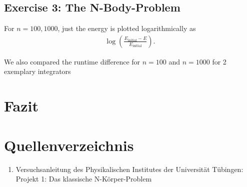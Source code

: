 \documentclass[ngerman]{article}
\begin{document}

\subsection{Exercise 3: The N-Body-Problem}  
For $n=100, 1000$, just the energy is plotted logarithmically as
\begin{align}
    \log(\frac{E_{\text{initial}}-E}{E_{\text{initial}}}).
\end{align}





We also compared the runtime difference for $n=100$ and $n=1000$  for 2 exemplary integrators
\section{Fazit}
\section{Quellenverzeichnis} 
\begin{enumerate}
    \item  Versuchsanleitung des Physikalischen Institutes der Universität Tübingen:  Projekt 1: Das klassische N-Körper-Problem \label{Versuchsanleitung}
\end{enumerate}
\end{document}
